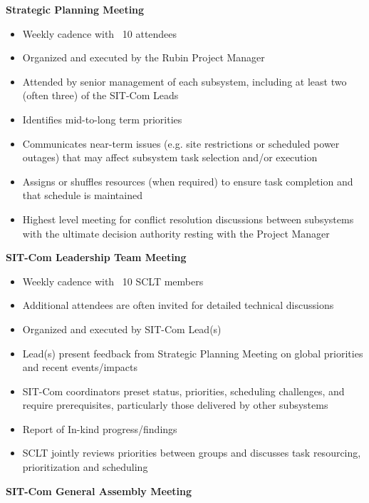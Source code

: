 \documentclass[SE,lsstdraft,authoryear,toc]{lsstdoc}
\begin{document}
\textbf{Strategic Planning Meeting}

\begin{itemize}
    \item Weekly cadence with ~10 attendees
    \item Organized and executed by the Rubin Project Manager
    \item Attended by senior management of each subsystem, including at least two (often three) of the SIT-Com Leads
    \item Identifies mid-to-long term priorities
    \item Communicates near-term issues (e.g. site restrictions or scheduled power outages) that may affect subsystem task selection and/or execution
    \item Assigns or shuffles resources (when required) to ensure task completion and that schedule is maintained
    \item Highest level meeting for conflict resolution discussions between subsystems with the ultimate decision authority resting with the Project Manager \end{itemize}

\textbf{SIT-Com Leadership Team Meeting}

\begin{itemize}
    \item Weekly cadence with ~10 SCLT members
    \item Additional attendees are often invited for detailed technical discussions
    \item Organized and executed by SIT-Com Lead(s)
    \item Lead(s) present feedback from Strategic Planning Meeting on global priorities and recent events/impacts
    \item SIT-Com coordinators preset status, priorities, scheduling challenges, and require prerequisites, particularly those delivered by other subsystems
    \item Report of In-kind progress/findings
    \item SCLT jointly reviews priorities between groups and discusses task resourcing, prioritization and scheduling
\end{itemize}


\textbf{SIT-Com General Assembly Meeting}
\end{document}
